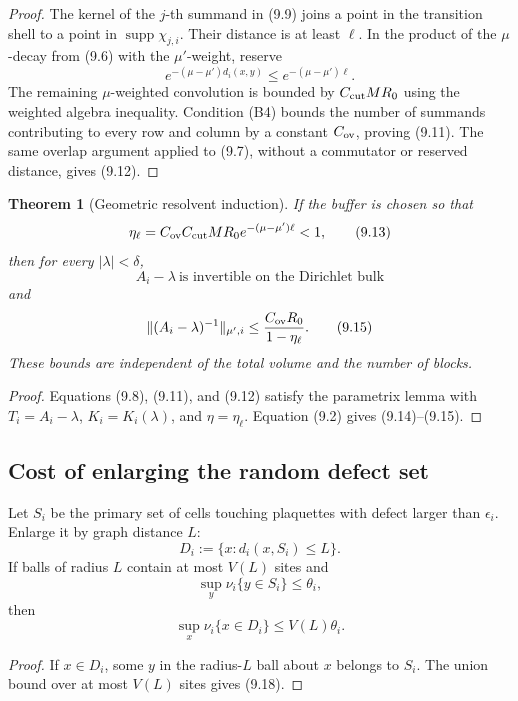 \documentclass[11pt]{article}
\newtheorem{theorem}{Theorem}[section]
\newcommand{\supp}{\operatorname{supp}}
\begin{document}
\begin{proof}
The kernel of the \(j\)-th summand in (9.9) joins a point in the
transition shell to a point in \(\supp\chi_{j,i}\).  Their distance is at
least \(\ell\).  In the product of the \(\mu\)-decay from (9.6) with the
\(\mu'\)-weight, reserve
\[
 e^{-(\mu-\mu')d_i(x,y)}
 \leq e^{-(\mu-\mu')\ell}.
\]
The remaining \(\mu\)-weighted convolution is bounded by
\(C_{\rm cut}MR_0\) using the weighted algebra inequality.
Condition (B4) bounds the number of summands contributing to every row
and column by a constant \(C_{\rm ov}\), proving (9.11).
The same overlap argument applied to (9.7), without a commutator or
reserved distance, gives (9.12).
\end{proof}

\begin{theorem}[Geometric resolvent induction]
\label{thm:v11v9-geometric}
If the buffer is chosen so that
\[
 \eta_\ell=
 C_{\rm ov}C_{\rm cut}MR_0e^{-(\mu-\mu')\ell}<1,
 \tag{9.13}
\]
then for every \(|\lambda|<\delta\),
\[
 A_i-\lambda\ \text{is invertible on the Dirichlet bulk}
 \tag{9.14}
\]
and
\[
 \|(A_i-\lambda)^{-1}\|_{\mu',i}
 \leq
 \frac{C_{\rm ov}R_0}{1-\eta_\ell}.
 \tag{9.15}
\]
These bounds are independent of the total volume and the number of
blocks.
\end{theorem}

\begin{proof}
Equations (9.8), (9.11), and (9.12) satisfy the parametrix lemma with
\(T_i=A_i-\lambda\), \(K_i=K_i(\lambda)\), and
\(\eta=\eta_\ell\).  Equation (9.2) gives (9.14)--(9.15).
\end{proof}

\subsection{Cost of enlarging the random defect set}

Let \(S_i\) be the primary set of cells touching plaquettes with defect
larger than \(\epsilon_i\).  Enlarge it by graph distance \(L\):
\[
 D_i:=\{x:d_i(x,S_i)\leq L\}.
 \tag{9.16}
\]
If balls of radius \(L\) contain at most \(V(L)\) sites and
\[
 \sup_y\nu_i\{y\in S_i\}\leq\theta_i,
 \tag{9.17}
\]
then
\[
 \sup_x\nu_i\{x\in D_i\}\leq V(L)\theta_i.
 \tag{9.18}
\]

\begin{proof}
If \(x\in D_i\), some \(y\) in the radius-\(L\) ball about \(x\) belongs
to \(S_i\).  The union bound over at most \(V(L)\) sites gives (9.18).
\end{proof}
\end{document}

